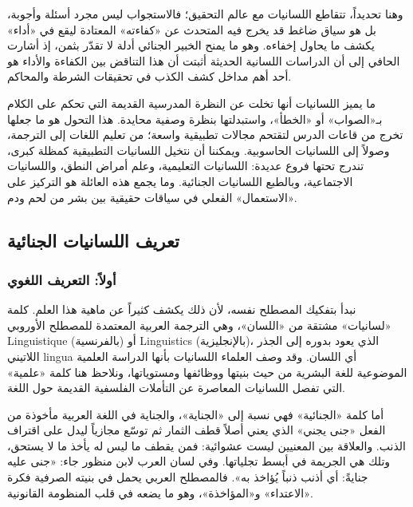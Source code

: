 وهنا تحديداً، تتقاطع اللسانيات مع عالم التحقيق؛ فالاستجواب ليس مجرد أسئلة وأجوبة، بل هو سياق ضاغط قد يخرج فيه المتحدث عن «كفاءته» المعتادة ليقع في «أداء» يكشف ما يحاول إخفاءه. وهو ما يمنح الخبير الجنائي أدلة لا تقدّر بثمن، إذ أشارت الحافي إلى أن الدراسات اللسانية الحديثة أثبتت أن هذا التناقض بين الكفاءة والأداء هو أحد أهم مداخل كشف الكذب في تحقيقات الشرطة والمحاكم\autocite[4]{alhafi2023}.

ما يميز اللسانيات أنها تخلت عن النظرة المدرسية القديمة التي تحكم على الكلام بـ«الصواب» أو «الخطأ»، واستبدلتها بنظرة وصفية محايدة. هذا التحول هو ما جعلها تخرج من قاعات الدرس لتقتحم مجالات تطبيقية واسعة؛ من تعليم اللغات إلى الترجمة، وصولاً إلى اللسانيات الحاسوبية. ويمكننا أن نتخيل اللسانيات التطبيقية كمظلة كبرى، تندرج تحتها فروع عديدة: اللسانيات التعليمية، وعلم أمراض النطق، واللسانيات الاجتماعية، وبالطبع اللسانيات الجنائية. وما يجمع هذه العائلة هو التركيز على «الاستعمال» الفعلي في سياقات حقيقية بين بشر من لحم ودم\autocite[24]{hammasa2000}.





\subsection{تعريف اللسانيات الجنائية}

\subsubsection*{أولاً: التعريف اللغوي}

نبدأ بتفكيك المصطلح نفسه، لأن ذلك يكشف كثيراً عن ماهية هذا العلم. كلمة «لسانيات» مشتقة من «اللسان»، وهي الترجمة العربية المعتمدة للمصطلح الأوروبي \textenglish{Linguistique} (بالفرنسية) أو \textenglish{Linguistics} (بالإنجليزية)، الذي يعود بدوره إلى الجذر اللاتيني \textenglish{lingua} أي اللسان. وقد وصف العلماء اللسانيات بأنها الدراسة العلمية الموضوعية للغة البشرية من حيث بنيتها ووظائفها ومستوياتها، ونلاحظ هنا كلمة «علمية» التي تفصل اللسانيات المعاصرة عن التأملات الفلسفية القديمة حول اللغة.

أما كلمة «الجنائية» فهي نسبة إلى «الجناية»، والجناية في اللغة العربية مأخوذة من الفعل «جنى يجني» الذي يعني أصلاً قطف الثمار ثم توسّع مجازياً ليدل على اقتراف الذنب. والعلاقة بين المعنيين ليست عشوائية: فمن يقطف ما ليس له يأخذ ما لا يستحق، وتلك هي الجريمة في أبسط تجلياتها. وفي لسان العرب لابن منظور جاء: «جنى عليه جنايةً: أي أذنب ذنباً يُؤاخذ به». فالمصطلح العربي يحمل في بنيته الصرفية فكرة «الاعتداء» و«المؤاخذة»، وهو ما يضعه في قلب المنظومة القانونية\autocite[13]{omar1998}.


